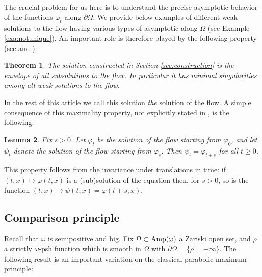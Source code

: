 \documentclass[11pt]{amsart}
\numberwithin{equation}{section}
\newtheorem{theorem}{Theorem}[section]
\newtheorem{lem}[theorem]{Lemma}
\newcommand{\f}{\varphi}
\newcommand{\p}{\psi}
\begin{document}
\smallskip

The crucial problem for us here is to understand the precise asymptotic behavior 
of the functions $\f_t$ along $\partial\Omega$.
We provide below examples of different weak solutions to the flow having various types of
asymptotic along $\Omega$ (see Example \ref{exa:notunique}). 
An important role is therefore played by the following property (see \cite[Theorem 5.8]{DNL17} and \cite[Theorem B]{Dan25}):

\begin{theorem} \label{thm:maxflow}
The solution 
 constructed in Section \ref{sec:construction} is the envelope of
all subsolutions to the flow. In particular it has minimal singularities among all
weak solutions to the flow.
\end{theorem}

In the rest of this article we call this solution {\it the} solution of the flow.
A simple consequence of this maximality property, 
not explicitly stated in \cite{GZ17,DNL17}, is the following:

\begin{lem} \label{lem:semigroup}
Fix $s>0$.
Let $\f_t$ be the solution of the flow starting from $\f_0$,
and let $\p_t$ denote the solution of the flow starting from  $\f_s$.
Then $\p_t=\f_{t+s}$ for all $t \geq 0$.
\end{lem}


This property  follows from  the invariance under translations in time: 
if $(t,x) \mapsto \f(t,x)$ is a (sub)solution of the equation then, 
 for $s > 0$, so is the function $(t,x) \mapsto \p(t,x) = \f(t + s,x)$.








\subsection{Comparison principle}
Recall that $\omega$ is semipositive and big. 
Fix $\Omega \subset {\rm Amp}(\omega)$ a Zariski open set,
and $\rho$ a strictly $\omega$-psh  function which is smooth in $\Omega$
 with $\partial \Omega = \{\rho=-\infty\}$.
The following result is an important variation on the classical parabolic maximum principle: 
\end{document}
